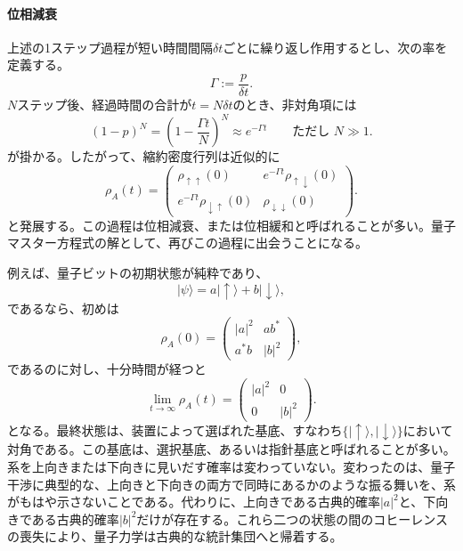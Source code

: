 \documentclass[a4paper,11pt,oneside]{article}
\theoremstyle{definition}
\numberwithin{equation}{section}
\begin{document}
\paragraph{位相減衰}



上述の1ステップ過程が短い時間間隔$\delta t$ごとに繰り返し作用するとし、次の率を定義する。
\begin{equation}
\Gamma := \frac{p}{\delta t} .
\end{equation}
$N$ステップ後、経過時間の合計が$t=N\delta t$のとき、非対角項には
\begin{equation}
(1-p)^N
=
\left(1-\frac{\Gamma t}{N}\right)^N
\approx e^{-\Gamma t}
\qquad
\text{ただし } N\gg 1 .
\end{equation}
が掛かる。したがって、縮約密度行列は近似的に
\begin{equation}
\rho_A(t)
=
\begin{pmatrix}
\rho_{\uparrow\uparrow}(0) & e^{-\Gamma t}\rho_{\uparrow\downarrow}(0) \\
e^{-\Gamma t}\rho_{\downarrow\uparrow}(0) & \rho_{\downarrow\downarrow}(0)
\end{pmatrix} .
\end{equation}
と発展する。この過程は位相減衰、または位相緩和と呼ばれることが多い。量子マスター方程式の解として、再びこの過程に出会うことになる。



例えば、量子ビットの初期状態が純粋であり、
\begin{equation}
|\psi\rangle = a|\uparrow\rangle + b|\downarrow\rangle ,
\end{equation}
であるなら、初めは
\begin{equation}
\rho_A(0)
=
\begin{pmatrix}
|a|^2 & ab^* \\
a^*b & |b|^2
\end{pmatrix} ,
\end{equation}
であるのに対し、十分時間が経つと
\begin{equation}
\lim_{t\to\infty}\rho_A(t)
=
\begin{pmatrix}
|a|^2 & 0 \\
0 & |b|^2
\end{pmatrix} .
\end{equation}
となる。最終状態は、装置によって選ばれた基底、すなわち$\{|\uparrow\rangle,|\downarrow\rangle\}$において対角である。この基底は、選択基底、あるいは指針基底と呼ばれることが多い。系を上向きまたは下向きに見いだす確率は変わっていない。変わったのは、量子干渉に典型的な、上向きと下向きの両方で同時にあるかのような振る舞いを、系がもはや示さないことである。代わりに、上向きである古典的確率$|a|^2 $と、下向きである古典的確率$ |b|^{2}$だけが存在する。これら二つの状態の間のコヒーレンスの喪失により、量子力学は古典的な統計集団へと帰着する。
\end{document}

